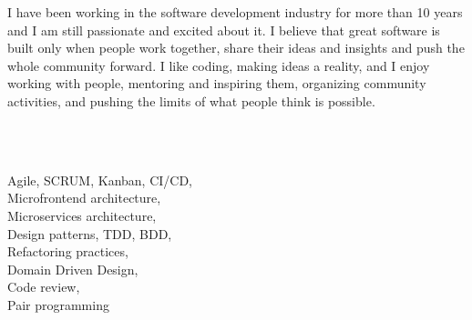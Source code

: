 \documentclass[9pt]{developercv} %
\begin{document}
\vspace{0.5cm}



\begin{minipage}[t]{0.4\textwidth} %
	\vspace{-\baselineskip} %
	I have been working in the software development industry for more than 10 years and I
	am still passionate and excited about it. I believe that great software is built
	only when people work together, share their ideas and insights and push the whole
	community forward. I like coding, making ideas a reality, and I enjoy working with
	people, mentoring and inspiring them, organizing community activities, and pushing
	the limits of what people think is possible.
\end{minipage}
\hfill %
\begin{minipage}[t]{0.5\textwidth} %
	\vspace{-\baselineskip} %
	\begin{barchart}{5.5}
	\end{barchart}
\end{minipage}
\\ \\ 
\begin{minipage}[t]{0.3\textwidth}
	\vspace{-\baselineskip} %

	
	Agile, SCRUM, Kanban, CI/CD, \\Microfrontend architecture,\\ Microservices architecture,\\ Design patterns, TDD, BDD,\\ Refactoring practices,\\ Domain Driven Design, \\Code review,\\ Pair programming
\end{minipage}
\end{document}
